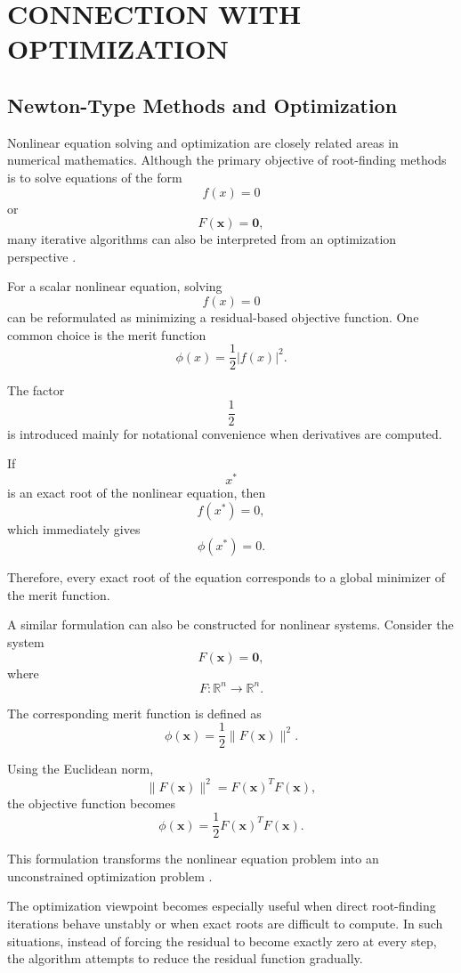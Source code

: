 \chapter{\MakeUppercase{Connection with Optimization}}

\section{Newton-Type Methods and Optimization}

Nonlinear equation solving and optimization are closely related areas in numerical mathematics. Although the primary objective of root-finding methods is to solve equations of the form
\[
f(x)=0
\]
or
\[
F(\mathbf{x})=\mathbf{0},
\]
many iterative algorithms can also be interpreted from an optimization perspective \cite{nocedal, kelley}.

For a scalar nonlinear equation, solving
\[
f(x)=0
\]
can be reformulated as minimizing a residual-based objective function. One common choice is the merit function
\[
\phi(x)=\frac{1}{2}|f(x)|^2.
\]

The factor
\[
\frac{1}{2}
\]
is introduced mainly for notational convenience when derivatives are computed.

If
\[
x^\ast
\]
is an exact root of the nonlinear equation, then
\[
f(x^\ast)=0,
\]
which immediately gives
\[
\phi(x^\ast)=0.
\]

Therefore, every exact root of the equation corresponds to a global minimizer of the merit function.

A similar formulation can also be constructed for nonlinear systems. Consider the system
\[
F(\mathbf{x})=\mathbf{0},
\]
where
\[
F:\mathbb{R}^n\to\mathbb{R}^n.
\]

The corresponding merit function is defined as
\[
\phi(\mathbf{x})
=
\frac{1}{2}
\|F(\mathbf{x})\|^2.
\]

Using the Euclidean norm,
\[
\|F(\mathbf{x})\|^2
=
F(\mathbf{x})^T F(\mathbf{x}),
\]
the objective function becomes
\[
\phi(\mathbf{x})
=
\frac{1}{2}
F(\mathbf{x})^T F(\mathbf{x}).
\]

This formulation transforms the nonlinear equation problem into an unconstrained optimization problem \cite{nocedal}.

The optimization viewpoint becomes especially useful when direct root-finding iterations behave unstably or when exact roots are difficult to compute. In such situations, instead of forcing the residual to become exactly zero at every step, the algorithm attempts to reduce the residual function gradually.

